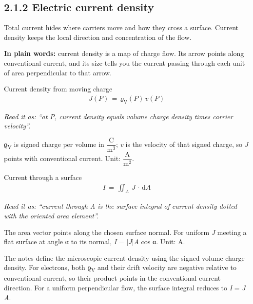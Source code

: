 \documentclass[11pt]{article}
\begin{document}
\begin{keepsection}
\section{2.1.2 Electric current density}

Total current hides where carriers move and how they cross a surface. Current density keeps the local direction and concentration of the flow.

\begin{plainbox}\textbf{In plain words:} current density is a map of charge flow. Its arrow points along conventional current, and its size tells you the current passing through each unit of area perpendicular to that arrow.\end{plainbox}

\begin{equationcard}{Current density from moving charge}
\[ \begin{gathered} {J}({P})\, =\, ϱ_{\mathrm{V}}({P})\, {v}({P}) \end{gathered} \]
{\small \emph{Read it as: “at P, current density equals volume charge density times carrier velocity”.}\par ϱ\textsubscript{V} is signed charge per volume in {\small\ensuremath{\dfrac{\mathrm{C}}{\mathrm{m}^{3}}}}; \textit{v} is the velocity of that signed charge, so \textit{J} points with conventional current. Unit: {\small\ensuremath{\dfrac{\mathrm{A}}{\mathrm{m}^{2}}}}.}
\end{equationcard}

\begin{equationcard}{Current through a surface}
\[ \begin{gathered} {I}\, =\, \iint_{{A}} \, {J}\, \cdot \, \mathrm{d}{A} \end{gathered} \]
{\small \emph{Read it as: “current through A is the surface integral of current density dotted with the oriented area element”.}\par The area vector points along the chosen surface normal. For uniform \textit{J} meeting a flat surface at angle α to its normal, \textit{I} = |\textit{J}|\textit{A} cos α. Unit: A.}
\end{equationcard}

The notes define the microscopic current density using the signed volume charge density. For electrons, both ϱ\textsubscript{V} and their drift velocity are negative relative to conventional current, so their product points in the conventional current direction. For a uniform perpendicular flow, the surface integral reduces to \textit{I} = \textit{J A}.


\end{keepsection}
\end{document}

